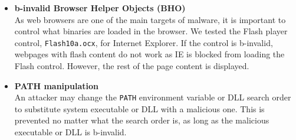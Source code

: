 \begin{itemize}
\item {\bf b-invalid Browser Helper Objects (BHO)} \\
As web browsers are one of the main targets of malware,
it is important to control what binaries are loaded in the browser.
We tested the Flash player control, {\tt Flash10a.ocx}, for Internet Explorer. 
If the control is b-invalid, webpages with flash content do not work as
IE is blocked from loading the Flash control.
However, the rest of the page content is displayed.

\item {\bf PATH manipulation} \\
An attacker may change the {\tt PATH} environment variable or DLL
search order to substitute system executable or DLL with a malicious one.
This is prevented no matter what the search order is, as long as
the malicious executable or DLL is b-invalid.

\end{itemize}


